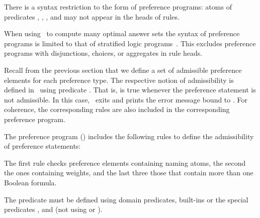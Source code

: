 \begin{note}
There is a syntax restriction to the form of preference programs:
      atoms of predicates , , 
      ,  and 
      may not appear in the heads of rules.
\end{note}

\begin{note}
When using \asprin\ to compute many optimal answer sets the syntax of preference programs
is limited to that of stratified logic programs~\cite{apblwa87a}.
This excludes preference programs with disjunctions, choices, or aggregates in rule heads.
\end{note}

Recall from the previous section that we define a set of admissible preference elements for each preference type.
The respective notion of admissibility is defined in \asprin\ using predicate .
That is,  is true whenever the preference statement is not admissible.
In this case, \asprin\ exits and prints the error message bound to .
For coherence, the corresponding rules are also included in the corresponding preference program.
\begin{example}
The preference program ()
includes the following rules to define the admissibility of  preference statements:
%

%
The first rule checks preference elements containing naming atoms, 
the second the ones containing weights, 
and the last three those that contain more than one Boolean formula.
\end{example}

\begin{note}
The predicate  must be defined using domain predicates, built-ins or the special 
predicates ,  and  
(not using  or ).
\end{note}


